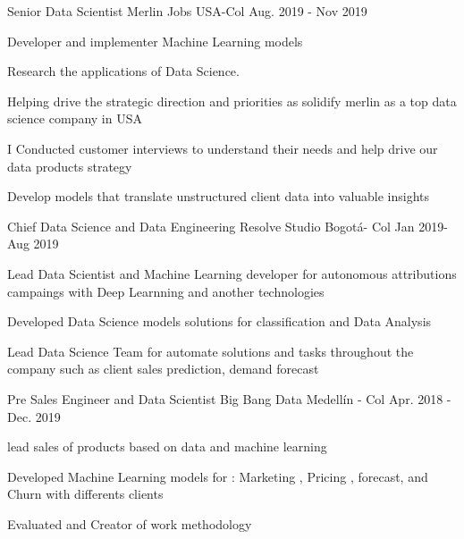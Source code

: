 \begin{cventries}
  \cventry
    {Senior Data Scientist} %
    {Merlin Jobs} %
    {USA-Col} %
    {Aug. 2019 - Nov 2019} %
    {
      \begin{cvitems} %
        \item {Developer and implementer Machine Learning models}
        \item {Research the applications of Data Science.}
        \item {Helping drive the strategic direction and priorities as  solidify merlin as a top data science company in USA}
        \item {I Conducted customer interviews to understand their needs and help drive our data products strategy}
        \item {Develop models that translate unstructured client data into valuable insights}
      \end{cvitems}
    }

  \cventry
    {Chief Data Science and Data Engineering } %
    {Resolve Studio} %
    {Bogotá- Col} %
    {Jan 2019- Aug 2019} %
    {
      \begin{cvitems} %
        \item {Lead Data Scientist and Machine Learning developer for autonomous attributions campaings with Deep Learnning and another technologies}
        \item {Developed  Data Science models solutions  for classification and Data Analysis}
        \item{Lead Data Science Team  for automate solutions and tasks throughout the company such as client sales prediction, demand forecast}
      \end{cvitems}
    }

  \cventry
    {Pre Sales Engineer and Data Scientist} %
    {Big Bang Data} %
    {Medellín - Col} %
    {Apr. 2018 - Dec. 2019} %
    {
      \begin{cvitems} %
        \item {lead sales of products based on data and machine learning}
        \item {Developed Machine Learning models for : Marketing , Pricing , forecast, and Churn with differents clients}
        \item {Evaluated and Creator of work methodology}
      \end{cvitems}
    }
    


\end{cventries}
